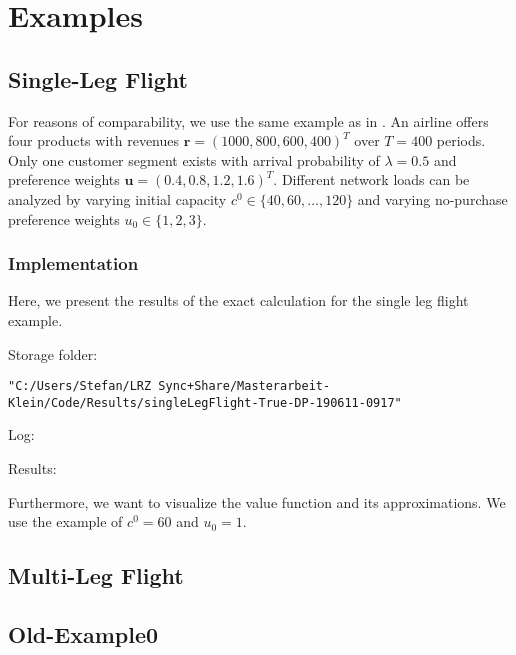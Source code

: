 \chapter{Examples}\label{ch:Examples}

\section{Single-Leg Flight}

For reasons of comparability, we use the same example as in \cite{Koch.2017}. An airline offers four products with revenues $\boldsymbol{r} = (1000, 800, 600, 400)^T$ over $T = 400$ periods. Only one customer segment exists with arrival probability of $\lambda = 0.5$ and preference weights $\boldsymbol{u} = (0.4, 0.8, 1.2, 1.6)^T$. Different network loads can be analyzed by varying initial capacity $c^0 \in \{40, 60, \dots, 120\}$ and varying no-purchase preference weights $u_0 \in \{1,2,3\}$.

\subsection{Implementation}

Here, we present the results of the exact calculation for the single leg flight example.

Storage folder: 

\texttt{"C:/Users/Stefan/LRZ Sync+Share/Masterarbeit-Klein/Code/Results/singleLegFlight-True-DP-190611-0917"}

Log:



Results:



Furthermore, we want to visualize the value function and its approximations. We use the example of $c^0 = 60$ and $u_0 = 1$. 

\section{Multi-Leg Flight}

\section{Old-Example0}

